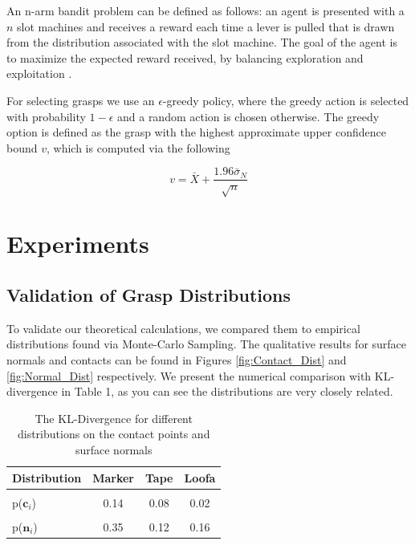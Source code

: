\documentclass[letterpaper, 10 pt, conference]{ieeeconf}  %
\begin{document}
An n-arm bandit problem can be defined as follows: an agent is presented with a $n$ slot machines and receives a reward each time a lever is pulled that is drawn from the distribution associated with the slot machine. The goal of the agent is to maximize the expected reward received, by balancing exploration and exploitation \cite{barto1998reinforcement}.

For selecting grasps we use an $\epsilon$-greedy policy, where the greedy action is selected with probability $1-\epsilon$ and a random action is chosen otherwise. The greedy option is defined as the grasp with the highest approximate upper confidence bound $v$, which is computed via the following \cite{mc} 

\begin{equation}
v = \bar{X} + \frac{1.96 \bar{\sigma}_N}{\sqrt{n}}
\end{equation}






\section{Experiments}

\subsection{Validation of Grasp Distributions}

To validate our theoretical calculations, we compared them to empirical distributions found via Monte-Carlo Sampling. The qualitative results for surface normals and contacts can be found in Figures \ref{fig:Contact_Dist} and \ref{fig:Normal_Dist} respectively. We present the numerical comparison with KL-divergence in Table 1, as you can see the distributions are very closely related. 

\begin{table}[h]
        \begin{tabular}{ l | c c c}
         Distribution & \bf Marker & \bf Tape & \bf Loofa \\ 
        \hline \\
         p($\textbf{c}_i$) & 0.14 & 0.08 & 0.02 \\
        \hline \\
        p($\textbf{n}_i$)& 0.35 & 0.12 & 0.16 \\
        \hline 
        \end{tabular}
        \caption{The KL-Divergence for different distributions on the contact points and surface normals}
		
        \vspace*{-10pt}
\end{table}
\end{document}
